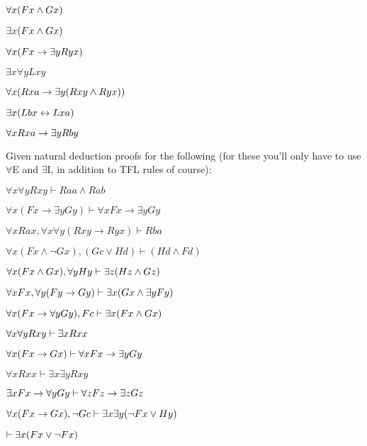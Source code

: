 \begin{earg}

\item $\forall x(Fx \wedge Gx)$

\item $\exists x(Fx \wedge Gx)$

\item $\forall x(Fx \rightarrow \exists yRyx)$

\item $\exists x \forall y Lxy$

\item $\forall x(Rxa \rightarrow \exists y(Rxy \wedge Ryx))$

\item $\exists x(Lbx \leftrightarrow Lxa)$

\item $\forall xRxa \rightarrow \exists yRby$



\end{earg}

\problempart Given natural deduction proofs for the following (for these you'll only have to use $\forall$E and $\exists$I, in addition to TFL rules of course):


\begin{earg}
\item $\forall x\forall y Rxy \vdash Raa \land Rab$
\item $\forall x(Fx \rightarrow \exists yGy) \vdash \forall x Fx \rightarrow \exists y Gy$
\item $\forall xRax, \forall x \forall y(Rxy \rightarrow Ryx) \vdash Rba$
\item $\forall x(Fx \land \lnot Gx), (Gc \lor Hd) \vdash (Hd \land Fd)$
\item $\forall x(Fx \wedge Gx), \forall yHy \vdash \exists z(Hz \wedge Gz)$
\item $\forall xFx, \forall y (Fy \rightarrow Gy) \vdash \exists x(Gx \wedge \exists yFy)$
\item $\forall x(Fx \rightarrow \forall yGy), Fc \vdash \exists x(Fx \wedge Gx)$
\item $\forall x \forall y Rxy \vdash \exists x Rxx$
\item $\forall x(Fx \rightarrow Gx) \vdash \forall xFx \rightarrow \exists yGy$
\item $\forall xRxx \vdash \exists x \exists y Rxy$
\item $\exists xFx \rightarrow \forall y Gy \vdash \forall z Fz \rightarrow \exists zGz$
\item $\forall x(Fx \rightarrow Gx), \neg Gc \vdash \exists x\exists y(\neg Fx \vee Hy)$
\item $\vdash \exists x(Fx \vee \neg Fx)$
\end{earg}




